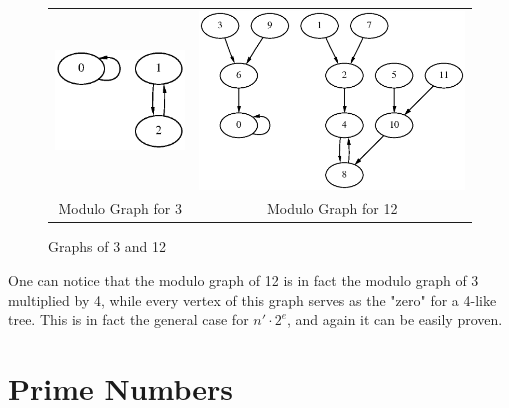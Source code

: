 \documentclass[a4paper]{report}
\begin{document}
\begin{figure}[ht]
\begin{tabular}{c||c}
\includegraphics[scale=0.75]{graph-3.eps} &
\includegraphics[scale=0.75]{graph-12.eps} \\
Modulo Graph for 3 &
Modulo Graph for 12
\end{tabular}
\caption{Graphs of 3 and 12}
\label{fig:graphs-of-3-and-12}
\end{figure}

One can notice that the modulo graph of 12 is in fact the modulo graph
of 3 multiplied by 4, while every vertex of this graph serves as the "zero"
for a 4-like tree. This is in fact the general case for $ n' \cdot 2^{e} $,
and again it can be easily proven.

\section{Prime Numbers}
\end{document}
